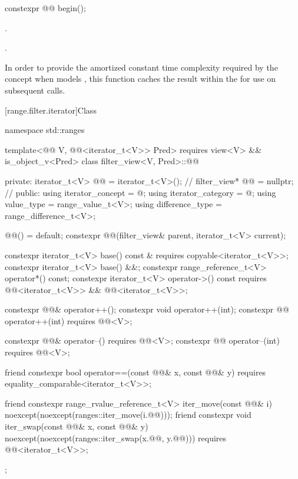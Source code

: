 %
\begin{itemdecl}
constexpr @@ begin();
\end{itemdecl}

\begin{itemdescr}
\pnum
\expects
{}.

\pnum
\returns
{}.

\pnum
\remarks
In order to provide the amortized constant time complexity required by
the  concept
when  models ,
this function caches the result within the
 for use on subsequent calls.
\end{itemdescr}

[range.filter.iterator]{Class }

%
\begin{codeblock}
namespace std::ranges {
  template<@@ V, @@<iterator_t<V>> Pred>
    requires view<V> && is_object_v<Pred>
  class filter_view<V, Pred>::@@ {
  private:
    iterator_t<V> @@ = iterator_t<V>();   // \expos
    filter_view* @@ = nullptr;             // \expos
  public:
    using iterator_concept  = @\seebelow@;
    using iterator_category = @\seebelow@;
    using value_type        = range_value_t<V>;
    using difference_type   = range_difference_t<V>;

    @@() = default;
    constexpr @@(filter_view& parent, iterator_t<V> current);

    constexpr iterator_t<V> base() const &
      requires copyable<iterator_t<V>>;
    constexpr iterator_t<V> base() &&;
    constexpr range_reference_t<V> operator*() const;
    constexpr iterator_t<V> operator->() const
      requires @@<iterator_t<V>> && @@<iterator_t<V>>;

    constexpr @@& operator++();
    constexpr void operator++(int);
    constexpr @@ operator++(int) requires @@<V>;

    constexpr @@& operator--() requires @@<V>;
    constexpr @@ operator--(int) requires @@<V>;

    friend constexpr bool operator==(const @@& x, const @@& y)
      requires equality_comparable<iterator_t<V>>;

    friend constexpr range_rvalue_reference_t<V> iter_move(const @@& i)
      noexcept(noexcept(ranges::iter_move(i.@@)));
    friend constexpr void iter_swap(const @@& x, const @@& y)
      noexcept(noexcept(ranges::iter_swap(x.@@, y.@@)))
      requires @@<iterator_t<V>>;
  };
}
\end{codeblock}

